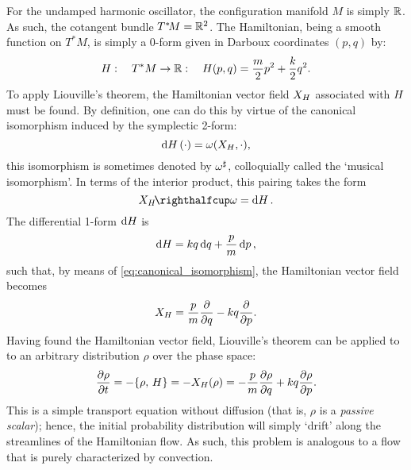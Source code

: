 For the undamped harmonic oscillator, the configuration manifold $M$ is simply $\mathbb{R}$. As such, the cotangent bundle $T^*\!M = \mathbb{R}^2$. The Hamiltonian, being a smooth function on $T^*M$, is simply a 0-form given in Darboux coordinates $(p, q)$ by:
\begin{equation}
    H:\quad T^*M \to \mathbb{R}:\quad H(p, q) = \frac{m}{2}p^2 + \frac{k}{2}q^2.
\end{equation}
To apply Liouville's theorem, the Hamiltonian vector field $X_{H}$ associated with $H$ must be found. By definition, one can do this by virtue of the canonical isomorphism induced by the symplectic 2-form:
$$ \dd{\ensuremath{H}}(\cdot) = \omega(X_{H}, \cdot), $$
this isomorphism is sometimes denoted by $\omega^\sharp$, colloquially called the `musical isomorphism'. In terms of the interior product, this pairing takes the form \cite{Osborne2017,Abraham1978}
\begin{equation} 
    \intpr{X_H}{\omega} = \dd{H}.
    \label{eq:canonical_isomorphism}
\end{equation}
The differential 1-form $\dd{\ensuremath{H}}$ is
$$ \dd{\ensuremath{H}} = kq\dd{q} + \frac{p}{m}\dd{p}, $$ 
such that, by means of \cref{eq:canonical_isomorphism}, the Hamiltonian vector field becomes
$$ X_{H} =  \frac{p}{m}\pdv{}{q} - kq\pdv{}{p}. $$
Having found the Hamiltonian vector field, Liouville's theorem can be applied to to an arbitrary distribution $\rho$ over the phase space:
\begin{equation}
    \pdv{\rho}{t} = -\qty{\rho,\,H} = -X_H(\rho) = -\frac{p}{m}\pdv{\rho}{q} + kq\pdv{\rho}{p}.
    \label{eq:pde_ho}
\end{equation}
This is a simple transport equation without diffusion (that is, $\rho$ is a \emph{passive scalar}); hence, the initial probability distribution will simply `drift' along the streamlines of the Hamiltonian flow. As such, this problem is analogous to a flow that is purely characterized by convection. 

